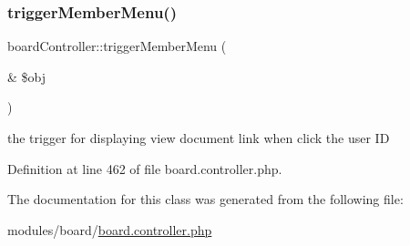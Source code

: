 \subsubsection{\texorpdfstring{trigger\+Member\+Menu()}{triggerMemberMenu()}}
{\footnotesize\ttfamily board\+Controller\+::trigger\+Member\+Menu (\begin{DoxyParamCaption}\item[{\&}]{\$obj }\end{DoxyParamCaption})}



the trigger for displaying \textquotesingle{}view document\textquotesingle{} link when click the user ID 



Definition at line 462 of file board.\+controller.\+php.



The documentation for this class was generated from the following file\+:\begin{DoxyCompactItemize}
\item 
modules/board/\hyperlink{board_8controller_8php}{board.\+controller.\+php}\end{DoxyCompactItemize}
